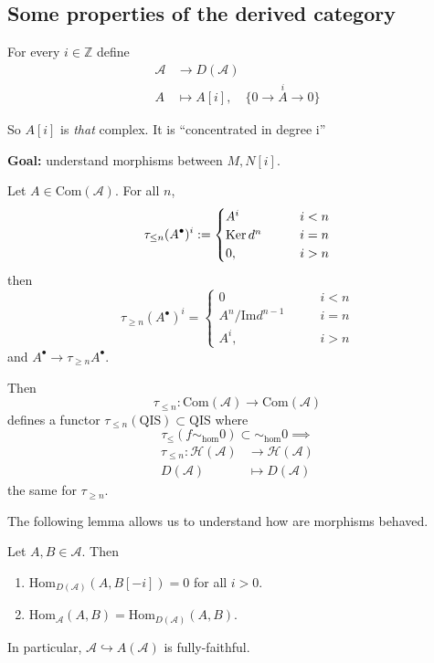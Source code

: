 \subsection{Some properties of the derived category}
\label{subsection-some-properties-of-the-derived-category}

For every $i \in \mathbb{Z}$ define
\begin{align*}
\mathcal{A} &\longrightarrow D(\mathcal{A}) \\
A &\longmapsto A[i], \quad \{0 \to \overset{i}{A} \to 0\}
\end{align*}

So $A[i]$ is {\it that} complex. It is ``concentrated in degree i''

{\bf Goal:} understand morphisms between $M,N[i]$.

\begin{definition}
\label{definition-embedding-in-Com}
Let $A \in \text{Com}(\mathcal{A})$. For all $n$, 
$$
\tau_{\leq n}(A^{\bullet})^i:=\begin{cases}
A^i\qquad &i<n \\
\mathop{\mathrm{Ker}} d^n\qquad &i=n\\
0,\quad &i>n
\end{cases}
$$ 
then 
$$
\tau_{\geq  n}(A^{\bullet})^i=\begin{cases}
0\qquad
 &i<n \\
A^n/\text{Im}d^{n-1}\qquad &i=n\\
A^i,\qquad &i>n
\end{cases}
$$
and $A^{\bullet}\to\tau_{\geq n}A^{\bullet}$.
\end{definition}

Then
$$
\tau_{\leq n}:\text{Com}(\mathcal{A}) \to \text{Com}(\mathcal{A})
$$
defines a functor $\tau_{\leq n}(\text{QIS})\subset \text{QIS}$ 
where 
$$
\tau_{\leq }(f \sim _{\text{hom}}0) \subset \sim_{\text{hom}}0
\implies
$$
\begin{align*}
\tau_{\leq n}: \mathcal{H}(\mathcal{A}) &\longrightarrow
\mathcal{H}(\mathcal{A}) \\
D(\mathcal{A}) &\longmapsto D(\mathcal{A})
\end{align*}
the same for $\tau_{\geq n}$.

\medskip
The following lemma allows us to understand how are morphisms behaved.

\begin{lemma}
\label{lemma-Homs}
Let $A,B \in \mathcal{A}$. Then
 \begin{enumerate}
\item $\text{Hom}_{D(\mathcal{A})}(A,B[-i])=0$ for all $i>0$.
\item $\text{Hom}_{\mathcal{A}}(A,B)=\text{Hom}_{D(\mathcal{A})}(A,B)$.
\end{enumerate}
In particular, $\mathcal{A} \hookrightarrow A(\mathcal{A})$ is fully-faithful.
\end{lemma}

